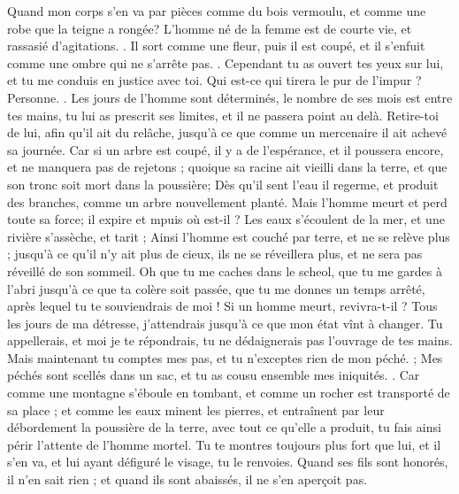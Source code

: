 \begin{multicols}{2}
Quand mon corps s'en va par pièces comme du bois vermoulu, et comme une robe que la teigne a rongée? 
\VerseOne{}L'homme né de la femme est de courte vie, et rassasié d'agitations. .
Il sort comme une fleur, puis il est coupé, et il s'enfuit comme une ombre qui ne s'arrête pas. .
Cependant tu as ouvert tes yeux sur lui, et tu me conduis en justice avec toi.
Qui est-ce qui tirera le pur de l'impur ? Personne. .
Les jours de l'homme sont déterminés, le nombre de ses mois est entre tes mains, tu lui as prescrit ses limites, et il ne passera point au delà.
Retire-toi de lui, afin qu'il ait du relâche, jusqu'à ce que comme un mercenaire il ait achevé sa journée.
Car si un arbre est coupé, il y a de l'espérance, et il poussera encore, et ne manquera pas de rejetons ; 
quoique sa racine ait vieilli dans la terre, et que son tronc soit mort dans la poussière;
Dès qu'il sent l'eau il regerme, et produit des branches, comme un arbre nouvellement planté. 
Mais l'homme meurt et perd toute sa force; il expire et mpuis où est-il ?
Les eaux s'écoulent de la mer, et une rivière s'assèche, et tarit ;
 Ainsi l'homme est couché par terre, et ne se relève plus ; jusqu'à ce qu'il n'y ait plus de cieux, ils ne se réveillera plus, et ne sera pas réveillé de son sommeil. 
Oh que tu me caches dans le scheol, que tu me gardes à l'abri jusqu'à ce que ta colère soit passée, que tu me donnes un temps arrêté, après lequel tu te souviendrais de moi !
Si un homme meurt, revivra-t-il ? Tous les jours de ma détresse, j'attendrais jusqu'à ce que mon état vînt à changer.
 Tu appellerais, et moi je te répondrais, tu ne dédaignerais pas l'ouvrage de tes mains.
Mais maintenant tu comptes mes pas, et tu n'exceptes rien de mon péché.  ;
Mes péchés sont scellés dans un sac, et tu as cousu ensemble mes iniquités. .
Car comme une montagne s'éboule en tombant, et comme un rocher est transporté de sa place ; 
 et comme les eaux minent les pierres, et entraînent par leur débordement la poussière de la terre, avec tout ce qu'elle a produit, tu fais ainsi périr l'attente de l'homme mortel.
Tu te montres toujours plus fort que lui, et il s'en va, et lui ayant défiguré le visage, tu le renvoies.
Quand ses fils sont honorés, il n'en sait rien ; et quand ils sont abaissés, il ne s'en aperçoit pas.

\end{multicols}
